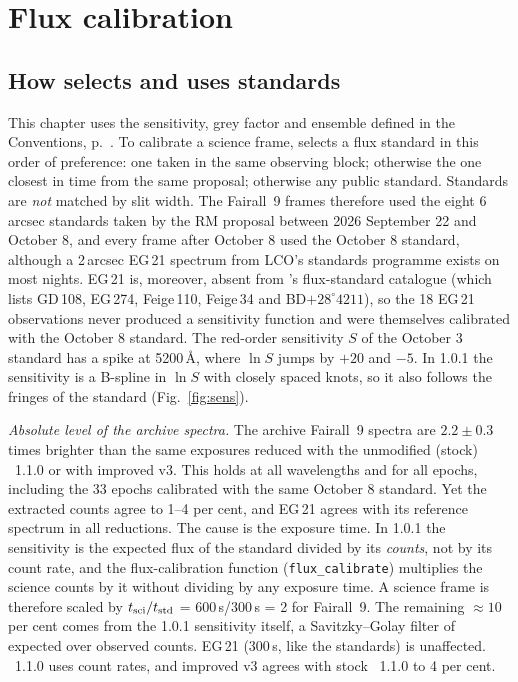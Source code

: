 \chapter{Flux calibration}
\label{sec:flux}

\section{How \banzai{} selects and uses standards}
\label{sec:flux_banzai}
This chapter uses the sensitivity, grey factor and ensemble defined in the Conventions, p.~\pageref{sec:conventions}. To calibrate a
science frame, \banzai{} selects a flux standard in this order of preference: one taken in the same observing block;
otherwise the one closest in time from the same proposal; otherwise any public standard. Standards are \emph{not} matched by slit width. The Fairall~9 frames
therefore used the eight 6\,arcsec standards taken by the RM proposal between 2026 September 22 and October 8, and
every frame after October 8 used the October 8 standard, although a 2\,arcsec EG\,21 spectrum from LCO's standards
programme exists on most nights. EG\,21 is, moreover, absent from \banzai's flux-standard catalogue (which lists
GD\,108, EG\,274, Feige\,110, Feige\,34 and BD$+28^\circ4211$), so the 18 EG\,21 observations never produced a
sensitivity function and were themselves calibrated with the October 8 standard. The red-order sensitivity $S$ of
the October 3 standard has a spike at 5200\,\AA, where $\ln S$ jumps by $+20$ and $-5$. In 1.0.1 the sensitivity is a
B-spline in $\ln S$ with closely spaced knots, so it also follows the fringes of the standard (Fig.~\ref{fig:sens}).

\textit{Absolute level of the archive spectra.} The archive Fairall~9 spectra are $2.2\pm0.3$ times brighter than
the same exposures reduced with the unmodified (stock) \banzai{}~1.1.0 or with improved v3. This holds at all
wavelengths and for all epochs, including the 33 epochs calibrated with the same October 8 standard. Yet the extracted
counts agree to 1--4 per cent, and EG\,21 agrees with its reference spectrum in all reductions. The cause is the
exposure time. In 1.0.1 the sensitivity is the expected flux of the standard divided by its \emph{counts}, not by its
count rate, and the flux-calibration function (\texttt{flux\_calibrate}) multiplies the science counts by it without
dividing by any exposure time. A science frame is therefore scaled by $t_{\rm sci}/t_{\rm std}$ =
600\,s/300\,s = 2 for Fairall~9. The remaining $\approx10$ per cent comes from the 1.0.1 sensitivity itself, a
Savitzky--Golay filter of expected over observed counts. EG\,21 (300\,s, like the standards) is unaffected.
\banzai{}~1.1.0 uses count rates, and improved v3 agrees with stock \banzai{}~1.1.0 to 4 per cent.


